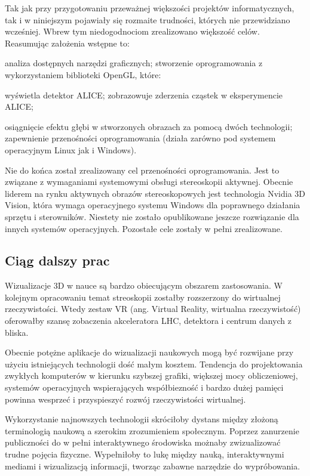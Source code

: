 Tak jak przy przygotowaniu przeważnej większości projektów informatycznych, tak i w niniejszym pojawiały się rozmaite trudności, których nie przewidziano wcześniej. Wbrew tym niedogodnociom zrealizowano większość celów. Reasumując założenia wstępne to:
\begin{itemize}
\itemi analiza dostępnych narzędzi graficznych;
\itemi stworzenie oprogramowania z wykorzystaniem biblioteki OpenGL, które:
	\begin{itemize}
	\itemii wyświetla detektor ALICE;
	\itemii zobrazowuje zderzenia cząstek w eksperymencie ALICE;
	\end{itemize}
\itemi osiągnięcie efektu głębi w stworzonych obrazach za pomocą dwóch technologii;
\itemi zapewnienie przenośności oprogramowania (działa zarówno pod systemem operacyjnym Linux jak i Windows).
\end{itemize}

Nie do końca został zrealizowany cel przenośności oprogramowania. Jest to związane z wymaganiami systemowymi obsługi stereoskopii aktywnej. Obecnie liderem na rynku aktywnych obrazów stereoskopowych jest technologia Nvidia 3D Vision, która wymaga operacyjnego systemu Windows dla poprawnego działania sprzętu i sterowników. Niestety nie zostało opublikowane jeszcze rozwiązanie dla innych systemów operacyjnych. Pozostałe cele zostały w pełni zrealizowane. 

\subsection{Ciąg dalszy prac}
Wizualizacje 3D w nauce są bardzo obiecującym obszarem zastosowania. W kolejnym opracowaniu temat streoskopii zostałby rozszerzony do wirtualnej rzeczywistości. Wtedy zestaw VR (ang. Virtual Reality, wirtualna rzeczywistość) oferowałby szansę zobaczenia akceleratora LHC, detektora i centrum danych z bliska.

Obecnie potężne aplikacje do wizualizacji naukowych mogą być rozwijane przy użyciu istniejących technologii dość małym kosztem. Tendencja do projektowania zwykłych komputerów w kierunku szybszej grafiki, większej mocy obliczeniowej, systemów operacyjnych wspierających współbiezność i bardzo dużej pamięci powinna wesprzeć i przyspieszyć rozwój rzeczywistości wirtualnej.

Wykorzystanie najnowszych technologii skróciłoby dystans między złożoną terminologią naukową a szerokim zrozumieniem społecznym. Poprzez zanurzenie publiczności do w pełni interaktywnego środowiska możnaby zwizualizować trudne pojęcia fizyczne. Wypełniłoby to lukę między nauką, interaktywnymi mediami i wizualizacją informacji, tworząc zabawne narzędzie do wypróbowania.

